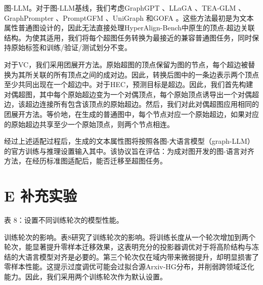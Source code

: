 \documentclass[10pt]{article}
\begin{document}
图-LLM。对于图-LLM基线，我们考虑GraphGPT 、LLaGA 、TEA-GLM 、GraphPrompter 、PromptGFM 、UniGraph 和GOFA 。这些方法最初是为文本属性普通图设计的，因此无法直接处理HyperAlign-Bench中原生的顶点-超边关联结构。为使其适用，我们将每个超图任务转换为最接近的兼容普通图任务，同时保持原始标签和训练/验证/测试划分不变。

对于VC，我们采用团展开方法。原始超图的顶点保留为图的节点，每个超边被替换为其所关联的所有顶点之间的成对边。因此，转换后图中的一条边表示两个顶点至少共同出现在一个超边中。对于HEC，预测目标是超边。因此，我们首先构建对偶超图，其中每个原始超边变为一个对偶顶点，每个原始顶点诱导出一个对偶超边，该超边连接所有包含该顶点的原始超边。然后，我们对此对偶超图应用相同的团展开方法。等价地，在生成的普通图中，每个节点对应一个原始超边，如果对应的原始超边共享至少一个原始顶点，则两个节点相连。

经过上述适配过程后，生成的文本属性图将按照各图-大语言模型（graph-LLM）的官方训练与推理设置输入其中。该协议旨在评估：为成对图开发的图-语言对齐方法，在经历标准图适配后，能否迁移至超图任务。

\section*{E 补充实验}

表 8：设置不同训练轮次的模型性能。

\begin{center}
\end{center}

训练轮次的影响。表8研究了训练轮次的影响。将训练长度从一个轮次增加到两个轮次，能显著提升零样本迁移效果，这表明充分的投影器调优对于将高阶结构与冻结的大语言模型对齐是必要的。第三个轮次仅在域内带来微弱提升，却明显损害了零样本性能。这提示过度调优可能会过拟合源Arxiv-HG分布，并削弱跨领域泛化能力。因此，我们采用两个训练轮次作为默认设置。
\end{document}
